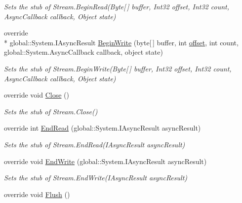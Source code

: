 \begin{DoxyCompactItemize}
\begin{DoxyCompactList}\small\item\em Sets the stub of Stream.\-Begin\-Read(\-Byte\mbox{[}$\,$\mbox{]} buffer, Int32 offset, Int32 count, Async\-Callback callback, Object state)\end{DoxyCompactList}\item 
override \\*
global\-::\-System.\-I\-Async\-Result \hyperlink{class_system_1_1_i_o_1_1_fakes_1_1_stub_unmanaged_memory_stream_a1d19581506bd4e06cbd30034339703ff}{Begin\-Write} (byte\mbox{[}$\,$\mbox{]} buffer, int \hyperlink{jquery-1_810_82_8js_a4a9f594d20d927164551fc7fa4751a2f}{offset}, int count, global\-::\-System.\-Async\-Callback callback, object state)
\begin{DoxyCompactList}\small\item\em Sets the stub of Stream.\-Begin\-Write(\-Byte\mbox{[}$\,$\mbox{]} buffer, Int32 offset, Int32 count, Async\-Callback callback, Object state)\end{DoxyCompactList}\item 
override void \hyperlink{class_system_1_1_i_o_1_1_fakes_1_1_stub_unmanaged_memory_stream_aa49e3ce5d6717eb156f0d97462db1538}{Close} ()
\begin{DoxyCompactList}\small\item\em Sets the stub of Stream.\-Close()\end{DoxyCompactList}\item 
override int \hyperlink{class_system_1_1_i_o_1_1_fakes_1_1_stub_unmanaged_memory_stream_ae328fbc4bb3443e4be61d4abfad32963}{End\-Read} (global\-::\-System.\-I\-Async\-Result async\-Result)
\begin{DoxyCompactList}\small\item\em Sets the stub of Stream.\-End\-Read(\-I\-Async\-Result async\-Result)\end{DoxyCompactList}\item 
override void \hyperlink{class_system_1_1_i_o_1_1_fakes_1_1_stub_unmanaged_memory_stream_a66cf2a733b6faf06d0d59ac14ed31396}{End\-Write} (global\-::\-System.\-I\-Async\-Result async\-Result)
\begin{DoxyCompactList}\small\item\em Sets the stub of Stream.\-End\-Write(\-I\-Async\-Result async\-Result)\end{DoxyCompactList}\item 
override void \hyperlink{class_system_1_1_i_o_1_1_fakes_1_1_stub_unmanaged_memory_stream_ac0383a2d3634936092d3be73718f8b86}{Flush} ()

\end{DoxyCompactItemize}
